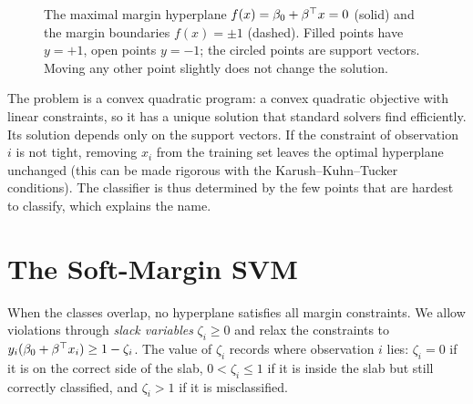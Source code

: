 \begin{figure}[ht]
\centering
{}
\caption{The maximal margin hyperplane $f(x)=\beta_0+\beta^{\top} x=0$ (solid) and the margin boundaries $f(x)=\pm1$ (dashed). Filled points have $y=+1$, open points $y=-1$; the circled points are support vectors. Moving any other point slightly does not change the solution.}
\label{fig:svm-margin}
\end{figure}

The problem is a convex quadratic program: a convex quadratic objective with linear constraints, so it has a unique solution that standard solvers find efficiently. Its solution depends only on the support vectors. If the constraint of observation $i$ is not tight, removing $x_i$ from the training set leaves the optimal hyperplane unchanged (this can be made rigorous with the Karush--Kuhn--Tucker conditions). The classifier is thus determined by the few points that are hardest to classify, which explains the name.

\section{The Soft-Margin SVM}\label{sec:soft-margin}

When the classes overlap, no hyperplane satisfies all margin constraints. We allow violations through \emph{slack variables} $\zeta_i\ge0$ and relax the constraints to $y_i(\beta_0+\beta^{\top} x_i)\ge1-\zeta_i$. The value of $\zeta_i$ records where observation $i$ lies: $\zeta_i=0$ if it is on the correct side of the slab, $0<\zeta_i\le1$ if it is inside the slab but still correctly classified, and $\zeta_i>1$ if it is misclassified.

